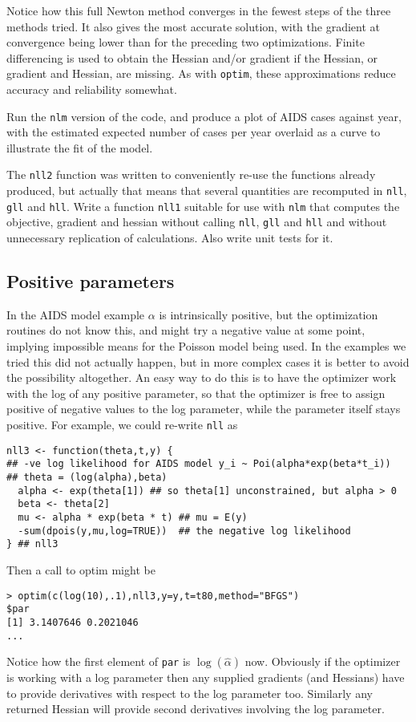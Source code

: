\documentclass[10pt] {article}
\theoremstyle{definition}
\begin{document}
Notice how this full Newton method converges in the fewest steps of the three methods tried. It also gives the most accurate solution, with the gradient at convergence being lower than for the preceding two optimizations. Finite differencing is used to obtain the Hessian and/or gradient if the Hessian, or gradient and Hessian, are missing. As with {\tt optim}, these approximations reduce accuracy and reliability somewhat.

\bigskip

 Run the {\tt nlm} version of the code, and produce a plot of AIDS cases against year, with the estimated  expected number of cases per year overlaid as a curve to illustrate the fit of the model.

 The {\tt nll2} function was written to conveniently re-use the functions already produced, but actually that means that several quantities are recomputed in {\tt nll}, {\tt gll} and {\tt hll}. Write a function {\tt nll1} suitable for use with {\tt nlm} that computes the objective, gradient and hessian without calling {\tt nll}, {\tt gll} and {\tt hll} and without unnecessary replication of calculations. Also write unit tests for it.  



\subsection{Positive parameters}

In the AIDS model example $\alpha$ is intrinsically positive, but the optimization routines do not know this, and might try a negative value at some point, implying impossible means for the Poisson model being used. In the examples we tried this did not actually happen, but in more complex cases it is better to avoid the possibility altogether. An easy way to do this is to have the optimizer work with the log of any positive parameter, so that the optimizer is free to assign positive of negative values to the log parameter, while the parameter itself stays positive. For example, we could re-write {\tt nll} as
\begin{lstlisting}
nll3 <- function(theta,t,y) {
## -ve log likelihood for AIDS model y_i ~ Poi(alpha*exp(beta*t_i))
## theta = (log(alpha),beta)
  alpha <- exp(theta[1]) ## so theta[1] unconstrained, but alpha > 0
  beta <- theta[2]  
  mu <- alpha * exp(beta * t) ## mu = E(y)
  -sum(dpois(y,mu,log=TRUE))  ## the negative log likelihood
} ## nll3
\end{lstlisting}
Then a call to optim might be
\begin{lstlisting}
> optim(c(log(10),.1),nll3,y=y,t=t80,method="BFGS")
$par
[1] 3.1407646 0.2021046
...
\end{lstlisting}
Notice how the first element of {\tt par} is $\log(\hat \alpha)$ now. Obviously if the optimizer is working with a log parameter then any supplied gradients (and Hessians) have to provide derivatives with respect to the log parameter too. Similarly any returned Hessian will provide second derivatives involving the log parameter. 
\end{document}
